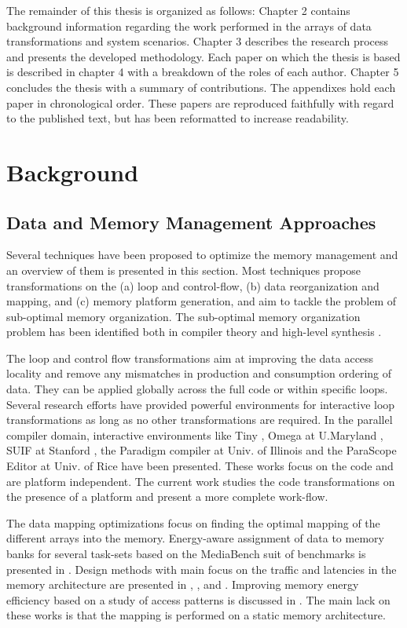 The remainder of this thesis is organized as follows: Chapter 2 contains background information regarding the work performed in the arrays of data transformations and system scenarios. 
Chapter 3 describes the research process and presents the developed methodology.
Each paper on which the thesis is based is described in chapter 4 with a breakdown of the roles of each author. 
Chapter 5 concludes the thesis with a summary of contributions. 
The appendixes hold each paper in chronological order. 
These papers are reproduced faithfully with regard to the published text, but has been reformatted to increase readability.

\chapter{Background} 
\label{background}

\section{Data and Memory Management Approaches}
Several techniques have been proposed to optimize the memory management and an overview of them is presented in this section.
Most techniques propose transformations on the (a) loop and control-flow, (b) data reorganization and mapping, and (c) memory platform generation, and aim to tackle the problem of sub-optimal memory organization.
The sub-optimal memory organization problem has been identified both in compiler theory \cite{43} and high-level synthesis \cite{519}.

The loop and control flow transformations aim at improving the data access locality and remove any mismatches in production and consumption ordering of data.
They can be applied globally across the full code or within specific loops.
Several research efforts have provided powerful environments for interactive loop transformations as long as no other transformations are required.
In the parallel compiler domain, interactive environments like Tiny \cite{556}, Omega at U.Maryland \cite{256}, SUIF at Stanford \cite{220}, the Paradigm compiler at Univ. of Illinois \cite{45} and the ParaScope Editor \cite{360} at Univ. of Rice have been presented. 
These works focus on the code and are platform independent.
The current work studies the code transformations on the presence of a platform and present a more complete work-flow.

The data mapping optimizations focus on finding the optimal mapping of the different arrays into the memory.
Energy-aware assignment of data to memory banks for several task-sets based on the MediaBench suit of benchmarks is presented in \cite{Mar03}. 
Design methods with main focus on the traffic and latencies in the memory architecture are presented in \cite{chen1999loop}, \cite{grun2000mist}, \cite{jantsch1994hardware} and \cite{passes1995multi}.
Improving memory energy efficiency based on a study of access patterns is discussed in \cite{kandemir2001improving}.
The main lack on these works is that the mapping is performed on a static memory architecture.

